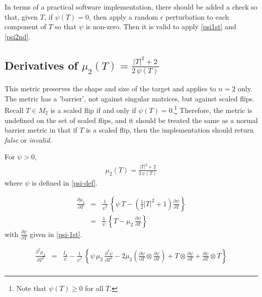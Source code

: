 \documentclass{report}
\begin{document}
\noindent In terms of a practical software implementation, there should be 
added a check so that, given $T$, if $\psi(T) = 0$, then apply
a random $\epsilon$ perturbation to each component of $T$ so that $\psi$ 
is non-zero.  Then it is valid to apply \ref{psi1st} and \ref{psi2nd}. \newline

\subsection{Derivatives of $\mu_2(T)=\frac{|T|^2 + 2}{2 \, \psi(T)}$}

\noindent This metric preserves the shape and size of the target and applies
to $n=2$ only. The metric has a 'barrier', not against singular matrices,
but against scaled flips. Recall $T \in M_2$ is a scaled flip if and only if 
$\psi(T)=0$.\footnote{Note that $\psi(T) \geq 0$ for all $T$.} Therefore, the metric is undefined on the set of 
scaled flips, and it should be treated the same as a normal barrier metric 
in that if $T$ is a scaled flip, then the implementation should return 
{\it false} or {\it invalid}. \newline

\noindent For $\psi> 0$,
\begin{eqnarray}
\mu_2(T)=\frac{|T|^2 + 2}{2 \, \psi(T)} 
\end{eqnarray}
where $\psi$ is defined in \ref{psi-def}. \newline

\begin{eqnarray}
\frac{\partial \mu_2}{\partial T} & = & \frac{1}{\psi^2} \, \left\{ \psi \, T - \left( \frac{1}{2} |T|^2 + 1 \right) \frac{\partial \psi}{\partial T} \right\} \\
& = & \frac{1}{\psi} \, \left\{ T - \mu_2 \,  \frac{\partial \psi}{\partial T} \right\} 
\end{eqnarray}
with $\frac{\partial \psi}{\partial T}$ given in \ref{psi-1st}. \newline

\begin{eqnarray}
\frac{\partial^2 \mu_2}{\partial T^2} & = & \frac{I_4}{\psi} - \frac{1}{\psi^2} \, \left\{ \psi \, \mu_2 \, \frac{\partial^2 \psi}{\partial T^2} - 2 \mu_2 \left( \frac{\partial \psi}{\partial T} \otimes \frac{\partial \psi}{\partial T} \right) + T \otimes \frac{\partial \psi}{\partial T} + \frac{\partial \psi}{\partial T} \otimes T \right\} \nonumber \\
\end{eqnarray}
\end{document}
